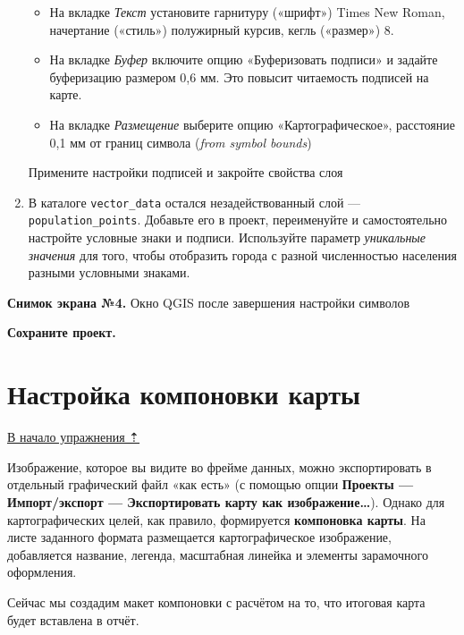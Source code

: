 \documentclass[
  12pt,
]{book}
\providecommand{\tightlist}{%
  \setlength{\itemsep}{0pt}\setlength{\parskip}{0pt}}
\begin{document}
\begin{enumerate}
  \begin{itemize}
  \tightlist
  \item
    На вкладке \emph{Текст} установите гарнитуру («шрифт») Times New Roman, начертание («стиль») полужирный курсив, кегль («размер») 8.
  \item
    На вкладке \emph{Буфер} включите опцию «Буферизовать подписи» и задайте буферизацию размером 0,6 мм. Это повысит читаемость подписей на карте.
  \item
    На вкладке \emph{Размещение} выберите опцию «Картографическое», расстояние 0,1 мм от границ символа (\emph{from symbol bounds})
  \end{itemize}

  Примените настройки подписей и закройте свойства слоя
\item
  В каталоге \texttt{vector\_data} остался незадействованный слой --- \texttt{population\_points}. Добавьте его в проект, переименуйте и самостоятельно настройте условные знаки и подписи. Используйте параметр \emph{уникальные значения} для того, чтобы отобразить города с разной численностью населения разными условными знаками.
\end{enumerate}

\textbf{Снимок экрана №4.} Окно QGIS после завершения настройки символов

\textbf{Сохраните проект.}

\hypertarget{map-design-general-layout}{%
\section{Настройка компоновки карты}\label{map-design-general-layout}}

\protect\hyperlink{map-design-general}{В начало упражнения ⇡}

Изображение, которое вы видите во фрейме данных, можно экспортировать в отдельный графический файл «как есть» (с помощью опции \textbf{Проекты --- Импорт/экспорт --- Экспортировать карту как изображение\ldots{}}). Однако для картографических целей, как правило, формируется \textbf{компоновка карты}. На листе заданного формата размещается картографическое изображение, добавляется название, легенда, масштабная линейка и элементы зарамочного оформления.

Сейчас мы создадим макет компоновки с расчётом на то, что итоговая карта будет вставлена в отчёт.
\end{document}
